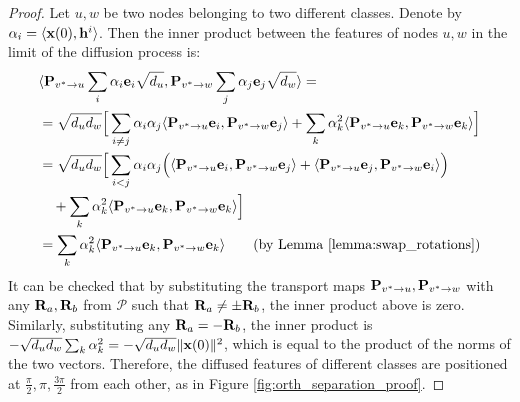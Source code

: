 \documentclass{article}
\def\ve{{\bf{e}}}
\def\vh{{\bf{h}}}
\def\vx{{\bf{x}}}
\def\mP{{\bf{P}}}
\def\mR{{\bf{R}}}
\def\gP{{\mathcal{P}}}
\DeclarePairedDelimiter{\norm}{\lVert}{\rVert}
\begin{document}
\begin{proof}
Let $u, w$ be two nodes belonging to two different classes. Denote by $\alpha_i = \langle \vx(0), \vh^i \rangle$. Then the inner product between the features of nodes $u, w$ in the limit of the diffusion process is: 
\begin{align}\label{eq:inner_product}
    &\langle \mP_{v^* \to u}\sum_i \alpha_i \ve_i \sqrt{d_u},  \mP_{v^* \to w}\sum_j \alpha_j \ve_j \sqrt{d_w} \rangle = \nonumber \\ 
    &= \sqrt{d_u d_w} \Big[ \sum_{i \neq j} \alpha_i \alpha_j \langle \mP_{v^* \to u} \ve_i,  \mP_{v^* \to w}\ve_j \rangle + \sum_{k} \alpha_k^2 \langle \mP_{v^* \to u} \ve_k,  \mP_{v^* \to w}\ve_k \rangle \Big] \nonumber \\
    &= \sqrt{d_u d_w} \Big[ \sum_{i < j} \alpha_i \alpha_j \Big( \langle \mP_{v^* \to u} \ve_i,  \mP_{v^* \to w}\ve_j \rangle + \langle \mP_{v^* \to u} \ve_j,  \mP_{v^* \to w}\ve_i \rangle\Big) \nonumber \\
    &\quad + \sum_{k} \alpha_k^2 \langle \mP_{v^* \to u} \ve_k,  \mP_{v^* \to w}\ve_k \rangle \Big]  \\
    &= \sum_{k} \alpha_k^2 \langle \mP_{v^* \to u} \ve_k,  \mP_{v^* \to w}\ve_k \rangle 
    \tag{by Lemma \ref{lemma:swap_rotations}} 
\end{align}
It can be checked that by substituting the transport maps $\mP_{v^* \to u},  \mP_{v^* \to w}$ with any $\mR_a, \mR_b$ from $\gP$ such that $\mR_a \neq \pm \mR_b$, the inner product above is zero. Similarly, substituting any $\mR_a = -\mR_b$, the inner product is $- \sqrt{d_u d_w} \sum_k \alpha_k^2 = -\sqrt{d_u d_w} \norm{\vx(0)}^2$, which is equal to the product of the norms of the two vectors. Therefore, the diffused features of different classes are positioned at $\frac{\pi}{2}, \pi, \frac{3\pi}{2}$ from each other, as in Figure \ref{fig:orth_separation_proof}. 
\end{proof}
\end{document}
